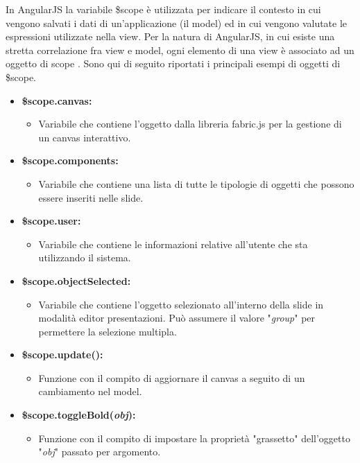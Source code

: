 In AngularJS la variabile \$scope è utilizzata per indicare il contesto in cui vengono salvati i dati di un’applicazione (il model) ed in cui vengono valutate le espressioni utilizzate nella view.
Per la natura di AngularJS, in cui esiste una stretta correlazione fra view e model, ogni elemento di una view è associato ad un oggetto di scope .
Sono qui di seguito riportati i principali esempi di oggetti di \$scope.
\begin{itemize}
    \item \textbf{ \$scope.canvas: }
	\begin{itemize}
	      \item Variabile che contiene l'oggetto dalla libreria fabric.js per la gestione di un canvas interattivo.
	\end{itemize}
    \item \textbf{ \$scope.components: }
	\begin{itemize}
	      \item Variabile che contiene una lista di tutte le tipologie di oggetti che possono essere inseriti nelle slide.
	\end{itemize}
    \item \textbf{ \$scope.user: }
	\begin{itemize}
	      \item Variabile che contiene le informazioni relative all'utente che sta utilizzando il sistema.
	\end{itemize}
    \item \textbf{ \$scope.objectSelected: }
	\begin{itemize}
	      \item Variabile che contiene l'oggetto selezionato all'interno della slide in modalità editor presentazioni. Può assumere il valore  "\textit{group}" per permettere la selezione multipla. 
	\end{itemize}
    \item \textbf{ \$scope.update(): }
	\begin{itemize}
	      \item Funzione con il compito di aggiornare il canvas a seguito di un cambiamento nel model.
	\end{itemize}
    \item \textbf{ \$scope.toggleBold(\textit{obj}): }
	\begin{itemize}
	      \item Funzione con il compito di impostare la proprietà "grassetto" dell'oggetto "\textit{obj}" passato per argomento.
	\end{itemize}

\end{itemize}
